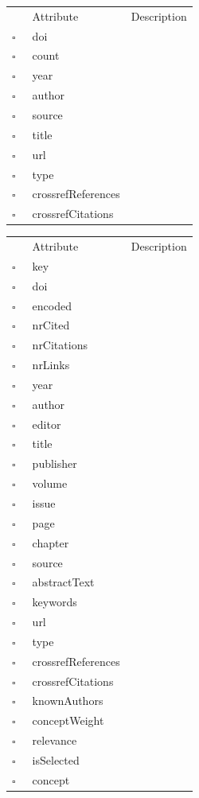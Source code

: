 \clearpage
\begin{table}
\caption{MissingCross  }

\begin{longtable}{llp{8cm}}
& Attribute & Description \\
$\square$\ & doi &  \\
$\square$\ & count &  \\
$\square$\ & year &  \\
$\square$\ & author &  \\
$\square$\ & source &  \\
$\square$\ & title &  \\
$\square$\ & url &  \\
$\square$\ & type &  \\
$\square$\ & crossrefReferences &  \\
$\square$\ & crossrefCitations &  \\
\end{longtable}
\label{attr:MissingCross}
\end{table}

\begin{table}
\caption{MissingWork  }

\begin{longtable}{llp{8cm}}
& Attribute & Description \\
$\square$\ & key &  \\
$\square$\ & doi &  \\
$\square$\ & encoded &  \\
$\square$\ & nrCited &  \\
$\square$\ & nrCitations &  \\
$\square$\ & nrLinks &  \\
$\square$\ & year &  \\
$\square$\ & author &  \\
$\square$\ & editor &  \\
$\square$\ & title &  \\
$\square$\ & publisher &  \\
$\square$\ & volume &  \\
$\square$\ & issue &  \\
$\square$\ & page &  \\
$\square$\ & chapter &  \\
$\square$\ & source &  \\
$\square$\ & abstractText &  \\
$\square$\ & keywords &  \\
$\square$\ & url &  \\
$\square$\ & type &  \\
$\square$\ & crossrefReferences &  \\
$\square$\ & crossrefCitations &  \\
$\square$\ & knownAuthors &  \\
$\square$\ & conceptWeight &  \\
$\square$\ & relevance &  \\
$\square$\ & isSelected &  \\
$\square$\ & concept &  \\
\end{longtable}
\label{attr:MissingWork}
\end{table}

